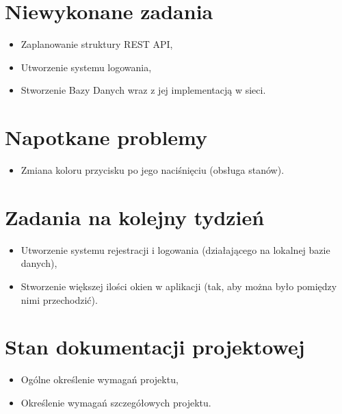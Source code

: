 \documentclass[12pt,a4paper]{mwart}
\begin{document}
\section{Niewykonane zadania}

\begin{itemize}
	\item Zaplanowanie struktury REST API,
	\item Utworzenie systemu logowania,
	\item Stworzenie Bazy Danych wraz z jej implementacją w sieci.
\end{itemize}

\section{Napotkane problemy}

\begin{itemize}
	\item Zmiana koloru przycisku po jego naciśnięciu (obsługa stanów).
\end{itemize}

\section{Zadania na kolejny tydzień}
\begin{itemize}
	\item Utworzenie systemu rejestracji i logowania (działającego na lokalnej bazie
	      danych),
	\item Stworzenie większej ilości okien w aplikacji (tak, aby można było pomiędzy nimi
	      przechodzić).
\end{itemize}

\section{Stan dokumentacji projektowej}
\begin{itemize}
	\item Ogólne określenie wymagań projektu,
	\item Określenie wymagań szczegółowych projektu.
\end{itemize}
\end{document}
